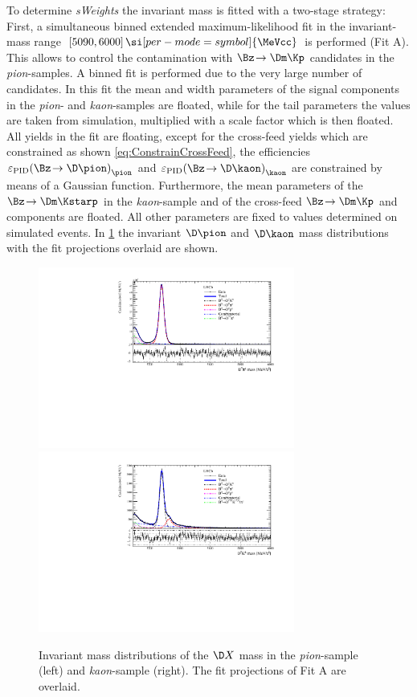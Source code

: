 To determine \emph{sWeights} the invariant \Bz mass is fitted with a two-stage strategy:
First, a simultaneous binned extended maximum-likelihood fit in the invariant-mass range $[5090, 6000]\,\si[per-mode=symbol]{\MeVcc}$ is performed (Fit A).
This allows to control the contamination with $\Bz\!\to\Dm\Kp$ candidates in the \emph{pion}-samples.
A binned fit is performed due to the very large number of candidates.
In this fit the mean and width parameters of the signal components in the \emph{pion}- and \emph{kaon}-samples are floated, while for the tail parameters the values are taken from simulation, multiplied with a scale factor which is then floated.
All yields in the fit are floating, except for the cross-feed yields which are constrained as shown \cref{eq:ConstrainCrossFeed}, \ie the efficiencies $\varepsilon_{\text{PID}}\!\left(\Bz\!\to\D \pion\right)_{\pion}$ and $\varepsilon_{\text{PID}}\!\left(\Bz\!\to\D \kaon\right)_{\kaon}$ are constrained by means of a Gaussian function.
Furthermore, the mean parameters of the $\Bz\!\to\Dm\Kstarp$ in the \emph{kaon}-sample and of the cross-feed $\Bz\!\to\Dm\Kp$ and \BdToDpi components are floated.
All other parameters are fixed to values determined on simulated events.
In \cref{fig:MassFitPlot} the invariant $\D\pion$  and $\D\kaon$ mass distributions with the fit projections overlaid are shown.
\begin{figure}[tbp]
    \centering
    \includegraphics[width=0.75\textwidth]{07MassFit/figs/MDFit_BeautyMass_Bd2DPi_withPulls.pdf}
    \includegraphics[width=0.75\textwidth]{07MassFit/figs/MDFit_BeautyMass_Bd2DK_withPulls.pdf}
    \caption{Invariant mass distributions of the $\D X$ mass in the \emph{pion}-sample (left) and \emph{kaon}-sample (right).
    The fit projections of Fit A are overlaid.}
    \label{fig:MassFitPlot}
\end{figure}

